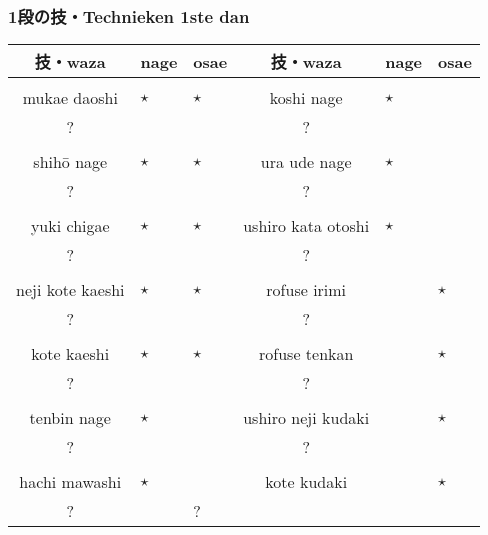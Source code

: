 \subsubsection{1段の技・Technieken 1ste dan}
\begin{table}[H]
\begin{center}
\begin{tabular}{c|p{0.5cm}|p{0.5cm}|c|p{0.5cm}|p{0.5cm}}
    技・waza & nage & osae & 技・waza & nage & osae\\
    \hline
    \ruby{}{}\ruby{}{} &  &  & \ruby{}{}\ruby{}{} &  & \\
    mukae daoshi & $\star$ & $\star$ & koshi nage & $\star$ & \\
    ? &  &  & ? &  & \\
    \hline
    \ruby{}{}\ruby{}{} &  &  & \ruby{}{}\ruby{}{} &  & \\
    shih\={o} nage & $\star$ & $\star$ & ura ude nage & $\star$ & \\
    ? &  &  & ? &  & \\
    \hline
    \ruby{}{}\ruby{}{} &  &  & \ruby{}{}\ruby{}{} &  & \\
    yuki chigae & $\star$ & $\star$ & ushiro kata otoshi & $\star$ & \\
    ? &  &  & ? &  & \\
    \hline
    \ruby{}{}\ruby{}{} &  &  & \ruby{}{}\ruby{}{} &  & \\
    neji kote kaeshi & $\star$ & $\star$ & rofuse irimi &  & $\star$\\
    ? &  &  & ? &  & \\
    \hline
    \ruby{}{}\ruby{}{} &  &  & \ruby{}{}\ruby{}{} &  & \\
    kote kaeshi & $\star$ & $\star$ & rofuse tenkan &  & $\star$\\
    ? &  &  & ? &  & \\
    \hline
    \ruby{}{}\ruby{}{} &  &  & \ruby{}{}\ruby{}{} &  & \\
    tenbin nage & $\star$ &  & ushiro neji kudaki &  & $\star$\\
    ? &  &  & ? &  & \\
    \hline
    \ruby{}{}\ruby{}{} &  &  & \ruby{}{}\ruby{}{} &  & \\
    hachi mawashi & $\star$ &  & kote kudaki &  & $\star$\\
    ? &  & ? &  & 
\end{tabular}
\end{center}
\label{dan_1_kihonnagewaza}
\end{table}

